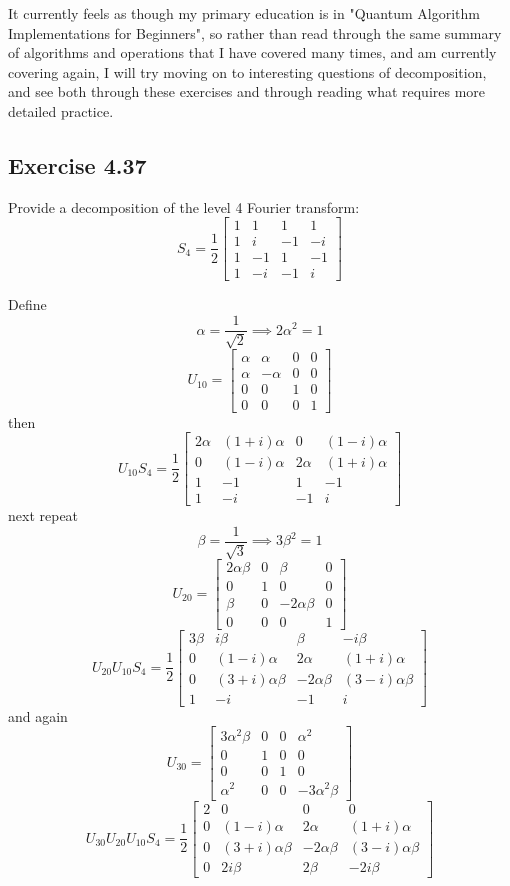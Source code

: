 \documentclass[]{article}
\begin{document}
It currently feels as though my primary education is in "Quantum Algorithm Implementations for Beginners", so rather than read through the same summary of algorithms and operations that I have covered many times, and am currently covering again, I will try moving on to interesting questions of decomposition, and see both through these exercises and through reading what requires more detailed practice.

\subsection{Exercise 4.37}
Provide a decomposition of the level 4 Fourier transform:
\[
S_4 =
\frac{1}{2}
\left[\begin{matrix}
 1& 1& 1& 1\\
 1& i&-1&-i\\
 1&-1& 1&-1\\
 1&-i&-1& i
\end{matrix}\right]
\]

Define
\[\alpha = \frac{1}{\sqrt{2}} \implies 2\alpha^2=1\]
\[
U_{10} = \left[\begin{matrix}
\alpha&\alpha&0&0\\
\alpha&-\alpha&0&0\\
0&0&1&0\\
0&0&0&1
\end{matrix}\right]
\]
then
\[
U_{10}S_4 =
\frac{1}{2}
\left[\begin{matrix}
2\alpha&(1+i)\alpha&0&(1-i)\alpha\\
0&(1-i)\alpha&2\alpha&(1+i)\alpha\\
1&-1&1&-1\\
1&-i&-1&i
\end{matrix}\right]
\]
next repeat
\[\beta = \frac{1}{\sqrt{3}} \implies 3\beta^2=1\]
\[
U_{20} = \left[\begin{matrix}
2\alpha\beta&0&\beta&0\\
0&1&0&0\\
\beta&0&-2\alpha\beta&0\\
0&0&0&1
\end{matrix}\right]
\]
\[
U_{20}U_{10}S_4 =
\frac{1}{2}
\left[\begin{matrix}
3\beta&i\beta&\beta&-i\beta\\
0&(1-i)\alpha&2\alpha&(1+i)\alpha\\
0&(3+i)\alpha\beta&-2\alpha\beta&(3-i)\alpha\beta\\
1&-i&-1&i
\end{matrix}\right]
\]
and again
\[
U_{30} = \left[\begin{matrix}
3\alpha^2\beta&0&0&\alpha^2\\
0&1&0&0\\
0&0&1&0\\
\alpha^2&0&0&-3\alpha^2\beta
\end{matrix}\right]
\]
\[
U_{30}U_{20}U_{10}S_4 =
\frac{1}{2}
\left[\begin{matrix}
2&0&0&0\\
0&(1-i)\alpha&2\alpha&(1+i)\alpha\\
0&(3+i)\alpha\beta&-2\alpha\beta&(3-i)\alpha\beta\\
0&2i\beta&2\beta&-2i\beta
\end{matrix}\right]
\]
\end{document}

